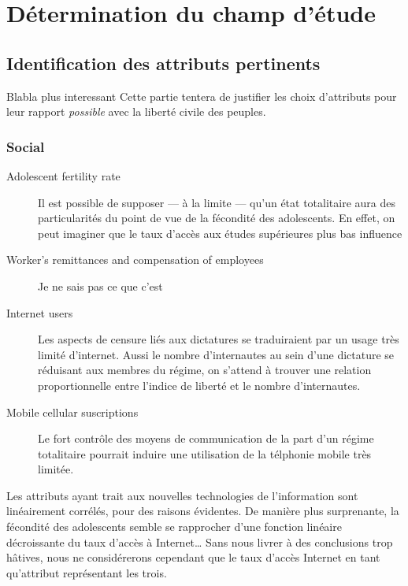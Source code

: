 
\section{Détermination du champ d'étude}
\subsection{Identification des attributs pertinents}
Blabla plus interessant
Cette partie tentera de justifier les choix d'attributs pour leur rapport \emph{possible} avec la liberté civile des peuples.
\subsubsection{Social}
\begin{description}
\item [Adolescent fertility rate] 
Il est possible de supposer --- à la limite --- qu'un état totalitaire aura des particularités du point de vue de la fécondité des adolescents. En effet, on peut imaginer que le taux d'accès aux études supérieures plus bas influence 
\item [Worker's remittances and compensation of employees]
{\huge Je ne sais pas ce que c'est}
\item [Internet users]
Les aspects de censure liés aux dictatures se traduiraient par un usage très limité d'internet. Aussi le nombre d'internautes 
au sein d'une dictature se réduisant aux membres du régime, on s'attend à trouver une relation proportionnelle entre l'indice de liberté et le nombre d'internautes. 
\item [Mobile cellular suscriptions]
Le fort contrôle des moyens de communication de la part d'un régime totalitaire pourrait induire une utilisation de la télphonie mobile très limitée.
\end{description}

Les attributs ayant trait aux nouvelles technologies de l'information sont linéairement corrélés, pour des raisons évidentes. De manière plus surprenante, la fécondité des adolescents semble se rapprocher d'une fonction linéaire décroissante du taux d'accès à Internet\ldots
Sans nous livrer à des conclusions trop hâtives, nous ne considérerons cependant que le taux d'accès Internet en tant qu'attribut représentant les trois.

